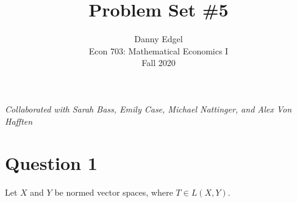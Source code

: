 \documentclass{article}
\begin{document}
\title{	Problem Set \#5 }
\author{ 	Danny Edgel 							\\ 
			Econ 703: Mathematical Economics I		\\
			Fall 2020								\\
		}
\maketitle\thispagestyle{empty}


\textit{Collaborated with Sarah Bass, Emily Case, Michael Nattinger, and Alex Von Hafften}


\section*{Question 1}
Let $X$ and $Y$ be normed vector spaces, where $T\in L(X,Y)$. 
\end{document}

